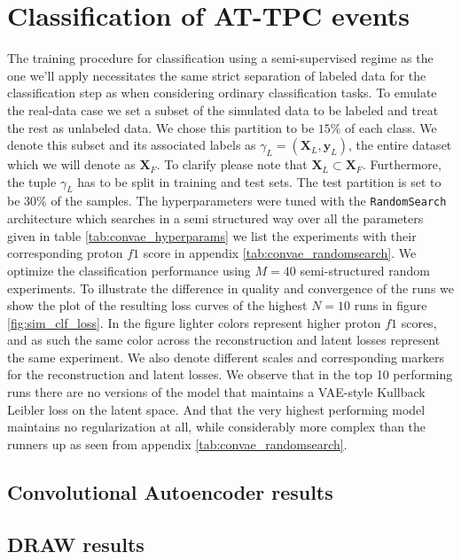 \section{Classification of AT-TPC events}

The training procedure for classification using a semi-supervised regime as the one we'll apply necessitates the same strict separation of labeled data for the classification step as when considering ordinary classification tasks. To emulate the real-data case we set a subset of the simulated data to be labeled and treat the rest as unlabeled data. We chose this partition to be $15\%$ of each class. We denote this subset and its associated labels as $\gamma_L=(\mathbf{X}_L, \mathbf{y}_L)$, the entire dataset which we will denote as $\mathbf{X}_F$. To clarify please note that $\mathbf{X}_L \subset \mathbf{X}_F$. Furthermore, the tuple $\gamma_L$ has to be split in training and test sets. The test partition is set to be $30\%$ of the samples. The hyperparameters were tuned with the \lstinline{RandomSearch} architecture which searches in a semi structured way over all the parameters given in table \ref{tab:convae_hyperparams} we list the experiments with their corresponding proton $f1$ score in appendix \ref{tab:convae_randomsearch}. We optimize the classification performance using $M=40$ semi-structured random experiments. To illustrate the difference in quality and convergence of the runs we show the plot of the resulting loss curves of the highest $N=10$ runs in figure \ref{fig:sim_clf_loss}. In the figure lighter colors represent higher proton $f1$ scores, and as such the same color across the reconstruction and latent losses represent the same experiment. We also denote different scales and corresponding markers for the reconstruction and latent losses. We observe that in the top 10 performing runs there are no versions of the model that maintains a VAE-style Kullback Leibler loss on the latent space. And that the very highest performing model maintains no regularization at all, while considerably more complex than the runners up as seen from appendix \ref{tab:convae_randomsearch}.

\subsection{Convolutional Autoencoder results}

\subsection{DRAW results}